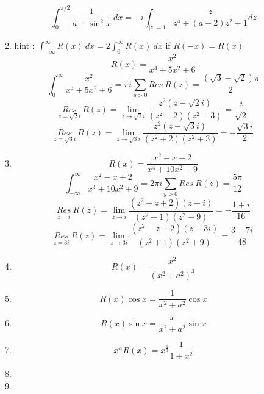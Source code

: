 \begin{enumerate}
\begin{enumerate}
			\[ \int_0^{\pi/2} \frac{1}{a + \sin^2 x}\ dx = -i \int_{|z|=1} \frac{z}{z^4+(a-2)z^2+1} dz \]
		\item  hint : $\int_{-\infty}^\infty R(x)\ dx = 2\int_0^\infty R(x)\ dx$ if $R(-x) = R(x)$
			\[ R(x) = \frac{x^2}{x^4+5x^2+6} \]
			\[ \int_0^\infty \frac{x^2}{x^4+5x^2+6} = \pi i \sum_{y > 0} Res\ R(z) = \frac{(\sqrt{3}-\sqrt{2})\pi}{2} \]
			\[ \underset{z=\sqrt{2}i}{Res}\ R(z) = \lim_{z \to \sqrt{2}i} \frac{z^2(z-\sqrt{2}i)}{(z^2+2)(z^2+3)} = \frac{i}{\sqrt{2}} \]
			\[ \underset{z=\sqrt{3}i}{Res}\ R(z) = \lim_{z \to \sqrt{3}i} \frac{z^2(z-\sqrt{3}i)}{(z^2+2)(z^2+3)} = -\frac{\sqrt{3}i}{2} \]
		\item
			\[ R(x) = \frac{x^2-x+2}{x^4+10x^2+9} \]
			\[ \int_{-\infty}^\infty \frac{x^2-x+2}{x^4+10x^2+9} = 2\pi i \sum_{y > 0} Res\ R(z) = \frac{5\pi}{12}\]
			\[ \underset{z=i}{Res}\ R(z) = \lim_{z \to i} \frac{(z^2-z+2)(z-i)}{(z^2+1)(z^2+9)} = -\frac{1+i}{16} \]
			\[ \underset{z=3i}{Res}\ R(z) = \lim_{z \to 3i} \frac{(z^2-z+2)(z-3i)}{(z^2+1)(z^2+9)} = \frac{3-7i}{48} \]
		\item
			\[ R(x) = \frac{x^2}{(x^2+a^2)^3} \]
		\item
			\[ R(x)\cos x = \frac{1}{x^2+a^2} \cos x \]
		\item
			\[ R(x)\sin x = \frac{x}{x^2+a^2} \sin x \]
		\item
			\[ x^\alpha R(x) = x^{\frac{1}{3}} \frac{1}{1+x^2} \]
		\item 
		\item
	\end{enumerate}
\end{enumerate}

